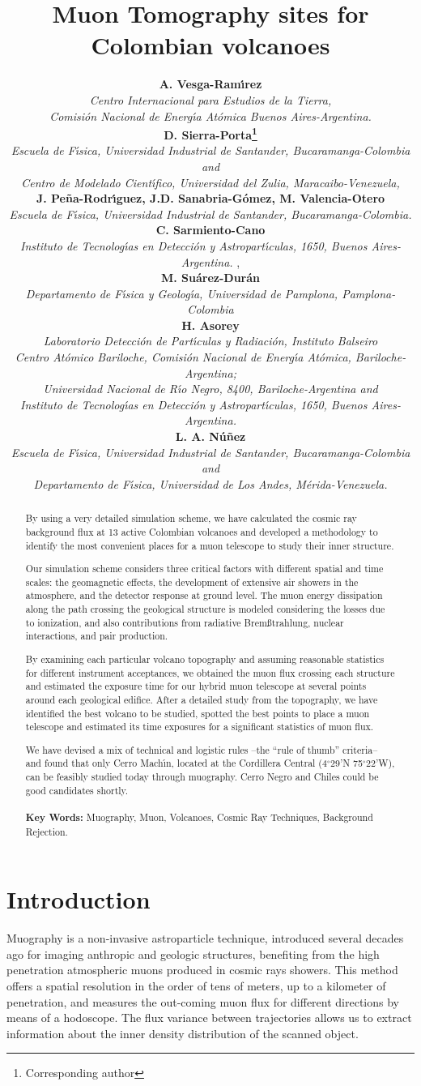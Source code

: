 \documentclass[letterpaper,10pt,titlepage,linenumber]{article}
\title{\textbf{Muon Tomography sites for Colombian volcanoes}}
\author{
\textbf{A. Vesga-Ram\'{\i}rez} \\
\textit{Centro Internacional para Estudios de la Tierra,} \\
\textit{Comisi\'on Nacional de Energ\'{\i}a At\'omica Buenos Aires-Argentina.} \\
\textbf{D. Sierra-Porta\thanks{\small Corresponding author} } \\ 
\textit{Escuela de F\'{\i}sica, Universidad Industrial de Santander, Bucaramanga-Colombia and }\\
\textit{Centro de Modelado Cient\'{\i}fico, Universidad del Zulia,  Maracaibo-Venezuela,} \\
\textbf{J. Pe\~na-Rodr\'{\i}guez, J.D. Sanabria-G\'omez, M. Valencia-Otero} \\
\textit{Escuela de F\'{\i}sica, Universidad Industrial de Santander, Bucaramanga-Colombia.} \\
\textbf{C. Sarmiento-Cano}\\ 
\textit{Instituto de Tecnolog\'{\i}as en Detecci\'on y Astropart\'{\i}culas, 1650, Buenos Aires-Argentina.} , \\ 
\textbf{M. Su\'arez-Dur\'an} \\
\textit{Departamento de F\'{\i}sica y Geolog\'{\i}a, Universidad de Pamplona, Pamplona-Colombia} \\
\textbf{H. Asorey} \\ 
\textit{Laboratorio Detecci\'on de Part\'{\i}culas y Radiaci\'on, Instituto Balseiro} \\ 
\textit{Centro At\'omico Bariloche, Comisi\'on Nacional de Energ\'{\i}a At\'omica, Bariloche-Argentina;} \\
\textit{Universidad Nacional de R\'{\i}o Negro, 8400, Bariloche-Argentina and} \\
\textit{Instituto de Tecnolog\'{\i}as en Detecci\'on y Astropart\'{\i}culas, 1650, Buenos Aires-Argentina.} \\
\textbf{L. A. N\'u\~nez } \\ 
\textit{Escuela de F\'{\i}sica, Universidad Industrial de Santander, Bucaramanga-Colombia and }\\
\textit{Departamento de F\'{\i}sica, Universidad de Los Andes,  M\'erida-Venezuela.}
}
\begin{document}
\maketitle
\begin{abstract}
By using a very detailed simulation scheme, we have calculated the cosmic ray background flux at 13 active Colombian volcanoes and developed a methodology to identify the most convenient places for a muon telescope to study their inner structure. 

Our simulation scheme considers three critical factors with different spatial and time scales: the geomagnetic effects, the development of extensive air showers in the atmosphere, and the detector response at ground level. The muon energy dissipation along the path crossing the geological structure is modeled considering the losses due to ionization, and also contributions from radiative Brem\ss trahlung, nuclear interactions, and pair production.

By examining each particular volcano topography and assuming reasonable statistics for different instrument acceptances, we obtained the muon flux crossing each structure and estimated the exposure time for our hybrid muon telescope at several points around each geological edifice.  After a detailed study from the topography, we have identified the best volcano to be studied, spotted the best points to place a muon telescope and estimated its time exposures for a significant statistics of muon flux.  

We have devised a mix of technical and logistic rules --the ``rule of thumb'' criteria-- and found that only Cerro Mach\'{\i}n, located at the Cordillera Central (4$^{\circ}$29'N 75$^{\circ}$22'W), can be feasibly studied today through muography. Cerro Negro and Chiles could be good candidates shortly. \\ \\
\noindent\textbf{Key Words:} Muography, Muon, Volcanoes, Cosmic Ray Techniques, Background Rejection. 
\end{abstract}


\section{Introduction}
Muography is a non-invasive astroparticle technique, introduced several decades ago for imaging anthropic and geologic structures, benefiting from the high penetration atmospheric muons produced in cosmic rays showers. This method offers a spatial resolution in the order of tens of meters, up to a kilometer of penetration, and measures the out-coming muon flux for different directions by means of a hodoscope. The flux variance between trajectories allows us to extract information about the inner density distribution of the scanned object.
\end{document}
